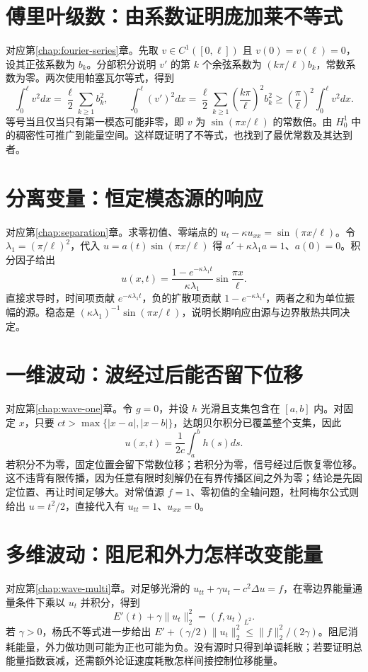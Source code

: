 \section{傅里叶级数：由系数证明庞加莱不等式}
对应第\ref{chap:fourier-series}章。先取 $v\in C^1([0,\ell])$ 且 $v(0)=v(\ell)=0$，设其正弦系数为 $b_k$。分部积分说明 $v'$ 的第 $k$ 个余弦系数为 $(k\pi/\ell)b_k$，常数系数为零。两次使用帕塞瓦尔等式，得到
\[
 \int_0^\ell v^2dx=\frac\ell2\sum_{k\ge1}b_k^2,\qquad
 \int_0^\ell(v')^2dx=\frac\ell2\sum_{k\ge1}\left(\frac{k\pi}{\ell}\right)^2b_k^2
 \ge\left(\frac\pi\ell\right)^2\int_0^\ell v^2dx.
\]
等号当且仅当只有第一模态可能非零，即 $v$ 为 $\sin(\pi x/\ell)$ 的常数倍。由 $H_0^1$ 中的稠密性可推广到能量空间。这样既证明了不等式，也找到了最优常数及其达到者。

\section{分离变量：恒定模态源的响应}
对应第\ref{chap:separation}章。求零初值、零端点的 $u_t-\kappa u_{xx}=\sin(\pi x/\ell)$。令 $\lambda_1=(\pi/\ell)^2$，代入 $u=a(t)\sin(\pi x/\ell)$ 得 $a'+\kappa\lambda_1a=1$、$a(0)=0$。积分因子给出
\[
 u(x,t)=\frac{1-e^{-\kappa\lambda_1t}}{\kappa\lambda_1}\sin\frac{\pi x}{\ell}.
\]
直接求导时，时间项贡献 $e^{-\kappa\lambda_1t}$，负的扩散项贡献 $1-e^{-\kappa\lambda_1t}$，两者之和为单位振幅的源。稳态是 $(\kappa\lambda_1)^{-1}\sin(\pi x/\ell)$，说明长期响应由源与边界散热共同决定。

\section{一维波动：波经过后能否留下位移}
对应第\ref{chap:wave-one}章。令 $g=0$，并设 $h$ 光滑且支集包含在 $[a,b]$ 内。对固定 $x$，只要 $ct>\max\{|x-a|,|x-b|\}$，达朗贝尔积分已覆盖整个支集，因此
\[
 u(x,t)=\frac1{2c}\int_a^b h(s)ds.
\]
若积分不为零，固定位置会留下常数位移；若积分为零，信号经过后恢复零位移。这不违背有限传播，因为任意有限时刻解仍在有界传播区间之外为零；结论是先固定位置、再让时间足够大。对常值源 $f=1$、零初值的全轴问题，杜阿梅尔公式则给出 $u=t^2/2$，直接代入有 $u_{tt}=1$、$u_{xx}=0$。

\section{多维波动：阻尼和外力怎样改变能量}
对应第\ref{chap:wave-multi}章。对足够光滑的 $u_{tt}+\gamma u_t-c^2\Delta u=f$，在零边界能量通量条件下乘以 $u_t$ 并积分，得到
\[
 E'(t)+\gamma\|u_t\|_2^2=(f,u_t)_{L^2}.
\]
若 $\gamma>0$，杨氏不等式进一步给出 $E'+(\gamma/2)\|u_t\|_2^2\le\|f\|_2^2/(2\gamma)$。阻尼消耗能量，外力做功则可能为正也可能为负。没有源时只得到单调耗散；若要证明总能量指数衰减，还需额外论证速度耗散怎样间接控制位移能量。

